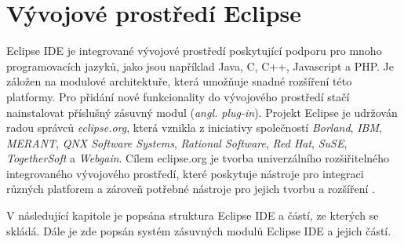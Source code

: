 \chapter{Vývojové prostředí Eclipse}                                      %
\label{chapter:eclipse_ide}
Eclipse IDE je integrované vývojové prostředí poskytující podporu pro mnoho programovacích jazyků, jako jsou například Java, C, C++, Javascript a PHP.  Je záložen na modulové architektuře, která umožňuje snadné rozšíření této platformy. Pro přidání nové funkcionality do vývojového prostředí stačí nainstalovat příslušný zásuvný modul (\emph{angl. plug-in}). Projekt Eclipse je udržován radou správců \emph{eclipse.org}, která vznikla z iniciativy společností \emph{Borland}, \emph{IBM}, \emph{MERANT}, \emph{QNX Software Systems}, \emph{Rational Software}, \emph{Red Hat}, \emph{SuSE}, \emph{TogetherSoft} a \emph{Webgain}. Cílem eclipse.org je tvorba univerzálního rozšiřitelného integrovaného vývojového prostředí, které poskytuje nástroje pro integraci různých platforem a zároveň potřebné nástroje pro jejich tvorbu a rozšíření \cite{eclipse-org}.

V následující kapitole je popsána struktura Eclipse IDE a částí, ze kterých se skládá. Dále je zde popsán systém zásuvných modulů Eclipse IDE a jejich částí.

